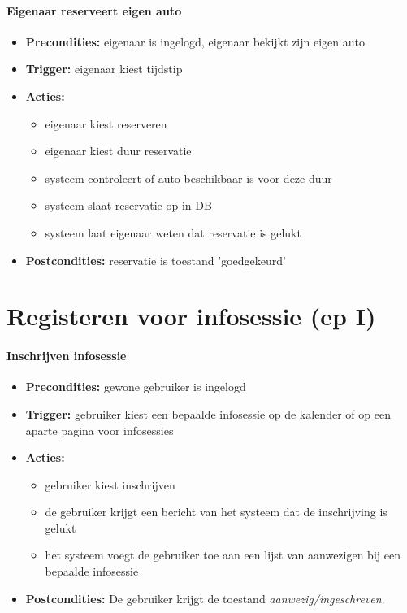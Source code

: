 \documentclass[]{article}
\begin{document}
\subsection{Eigenaar reserveert eigen auto}
\begin{itemize}
\item \textbf{Precondities:} eigenaar is ingelogd, eigenaar bekijkt zijn eigen auto
\item \textbf{Trigger:} eigenaar kiest tijdstip
\item \textbf{Acties:} \begin{itemize}
\item	eigenaar kiest reserveren
\item 	eigenaar kiest duur reservatie
\item	systeem controleert of auto beschikbaar is voor deze duur
\item	systeem slaat reservatie op in DB
\item      systeem laat eigenaar weten dat reservatie is gelukt
\end{itemize}
\item \textbf{Postcondities:} reservatie is toestand 'goedgekeurd'
\end{itemize}

\part{Registeren voor infosessie (ep I)}

\subsection{Inschrijven infosessie}
\begin{itemize}

\item \textbf{Precondities:} gewone gebruiker is ingelogd
\item \textbf{Trigger:} gebruiker kiest een bepaalde infosessie op de kalender of op een aparte pagina voor infosessies 
\item \textbf{Acties:} \begin{itemize}
\item	gebruiker kiest inschrijven
\item	de gebruiker krijgt een bericht van het systeem dat de inschrijving is gelukt
\item	het systeem voegt de gebruiker toe aan een lijst van aanwezigen bij een bepaalde infosessie
\end{itemize}
\item \textbf{Postcondities:} De gebruiker krijgt de toestand \emph{aanwezig/ingeschreven}.
\end{itemize}
\end{document}
